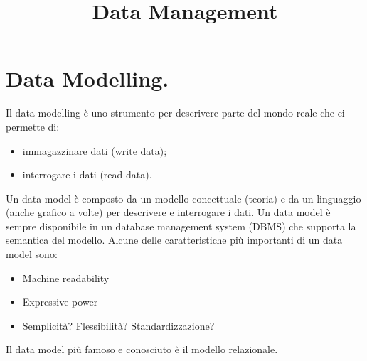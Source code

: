 \documentclass[a4page, 11pt]{article}
\title{Data Management}
\author{}
\date{}
\begin{document}
\maketitle

\section{Data Modelling.}
Il data modelling è uno strumento per descrivere parte del mondo reale che ci permette di:
\begin{itemize}[noitemsep]
\item immagazzinare dati (write data);
\item interrogare i dati (read data).
\end{itemize}
Un data model è composto da un modello concettuale (teoria) e da un linguaggio (anche grafico a volte) per descrivere e interrogare i dati. Un data model è sempre disponibile in un database management system (DBMS) che supporta la semantica del modello. Alcune delle caratteristiche più importanti di un data model sono:
\begin{itemize}[noitemsep]
\item Machine readability
\item Expressive power
\item Semplicità? Flessibilità? Standardizzazione?
\end{itemize}
Il data model più famoso  e conosciuto è il modello relazionale.
\end{document}
